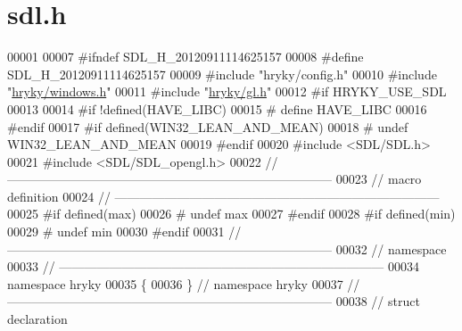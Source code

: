 \hypertarget{sdl_8h_source}{\section{sdl.\-h}
}

\begin{DoxyCode}
00001 
00007 \textcolor{preprocessor}{#ifndef SDL\_H\_20120911114625157}
00008 \textcolor{preprocessor}{}\textcolor{preprocessor}{#define SDL\_H\_20120911114625157}
00009 \textcolor{preprocessor}{}\textcolor{preprocessor}{#include "hryky/config.h"}
00010 \textcolor{preprocessor}{#include "\hyperlink{windows_8h}{hryky/windows.h}"}
00011 \textcolor{preprocessor}{#include "\hyperlink{gl_8h}{hryky/gl.h}"}
00012 \textcolor{preprocessor}{#if HRYKY\_USE\_SDL}
00013 \textcolor{preprocessor}{}
00014 \textcolor{preprocessor}{#if !defined(HAVE\_LIBC)}
00015 \textcolor{preprocessor}{}\textcolor{preprocessor}{#    define HAVE\_LIBC}
00016 \textcolor{preprocessor}{}\textcolor{preprocessor}{#endif}
00017 \textcolor{preprocessor}{}\textcolor{preprocessor}{#if defined(WIN32\_LEAN\_AND\_MEAN)}
00018 \textcolor{preprocessor}{}\textcolor{preprocessor}{#   undef WIN32\_LEAN\_AND\_MEAN}
00019 \textcolor{preprocessor}{}\textcolor{preprocessor}{#endif}
00020 \textcolor{preprocessor}{}\textcolor{preprocessor}{#include <SDL/SDL.h>}
00021 \textcolor{preprocessor}{#include <SDL/SDL\_opengl.h>}
00022 \textcolor{comment}{//
      ------------------------------------------------------------------------------}
00023 \textcolor{comment}{// macro definition}
00024 \textcolor{comment}{//
      ------------------------------------------------------------------------------}
00025 \textcolor{preprocessor}{#if defined(max)}
00026 \textcolor{preprocessor}{}\textcolor{preprocessor}{#   undef max}
00027 \textcolor{preprocessor}{}\textcolor{preprocessor}{#endif}
00028 \textcolor{preprocessor}{}\textcolor{preprocessor}{#if defined(min)}
00029 \textcolor{preprocessor}{}\textcolor{preprocessor}{#   undef min}
00030 \textcolor{preprocessor}{}\textcolor{preprocessor}{#endif}
00031 \textcolor{preprocessor}{}\textcolor{comment}{//
      ------------------------------------------------------------------------------}
00032 \textcolor{comment}{// namespace}
00033 \textcolor{comment}{//
      ------------------------------------------------------------------------------}
00034 \textcolor{keyword}{namespace }hryky
00035 \{
00036 \} \textcolor{comment}{// namespace hryky}
00037 \textcolor{comment}{//
      ------------------------------------------------------------------------------}
00038 \textcolor{comment}{// struct declaration}

\end{DoxyCode}

